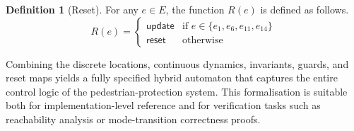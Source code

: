 \documentclass[journal]{IEEEtran}
\theoremstyle{definition}
\newtheorem{definition}{Definition}
\theoremstyle{property}
\newcommand{\sns}{\mathsf{update}}
\newcommand{\rst}{\mathsf{reset}}
\begin{document}
\begin{definition}[Reset]\label{def:app_reset}
For any $e \in E$, the function $R(e)$ is defined as follows.
\[R(e) = 
    \begin{cases}
        \sns & \text{if } e \in \{ e_1, e_6, e_{11}, e_{14}\} \\
        \rst & \text{otherwise}
    \end{cases}
\]
\end{definition}

Combining the discrete locations, continuous dynamics, invariants, guards, and reset maps yields a fully specified hybrid automaton that captures the entire control logic of the pedestrian-protection system. This formalisation is suitable both for implementation-level reference and for verification tasks such as reachability analysis or mode-transition correctness proofs.
\end{document}
